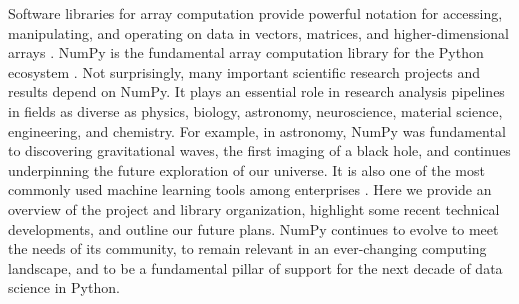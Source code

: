 




Software libraries for array computation provide powerful notation
for accessing, manipulating, and operating on data in vectors,
matrices, and higher-dimensional arrays \cite{iverson1980notation}.
NumPy is the fundamental array computation library for the Python ecosystem
\cite{dubois2007guest,oliphant2007python,millman2011python,perez2011python}.
Not surprisingly, many important scientific research projects and results
depend on NumPy.
It plays an essential role in research analysis pipelines in fields as
diverse as physics, biology, astronomy, neuroscience, material science,
engineering, and chemistry.
For example, in astronomy, NumPy was fundamental to discovering gravitational
waves\cite{pycbc}, the first imaging of a black
hole\cite{eht-imaging}, and continues underpinning the future exploration of our universe\cite{jenness2018lsst}.
It is also one of the most commonly used machine learning tools among
enterprises \cite{451report2018}.
Here we provide an overview of the project and library organization, highlight
some recent technical developments, and outline our future plans.
NumPy continues to evolve to meet the needs of its community, to remain
relevant in an ever-changing computing landscape, and to be a fundamental
pillar of support for the next decade of data science in Python.
